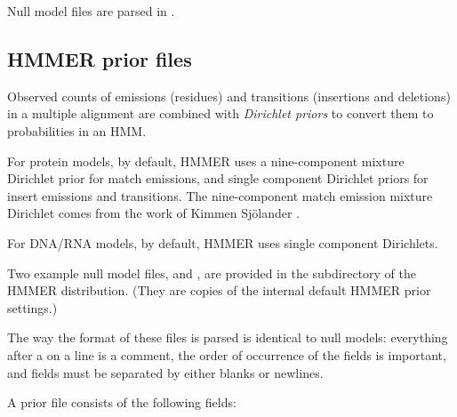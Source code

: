 Null model files are parsed in .

\subsection{HMMER prior files}
\label{section:priorfiles}

Observed counts of emissions (residues) and transitions (insertions
and deletions) in a multiple alignment are combined with
\textit{Dirichlet priors} to convert them to probabilities
in an HMM. 

For protein models, by default, HMMER uses a nine-component mixture
Dirichlet prior for match emissions, and single component Dirichlet
priors for insert emissions and transitions. The nine-component match
emission mixture Dirichlet comes from the work of Kimmen Sj\"{o}lander
\cite{Sjolander96}.

For DNA/RNA models, by default, HMMER uses single component
Dirichlets.

Two example null model files,  and ,
are provided in the  subdirectory of the HMMER
distribution. (They are copies of the internal default HMMER prior
settings.)

The way the format of these files is parsed is identical to null
models: everything after a \prog{\#} on a line is a comment, the order
of occurrence of the fields is important, and fields must be separated
by either blanks or newlines.

A prior file consists of the following fields:

